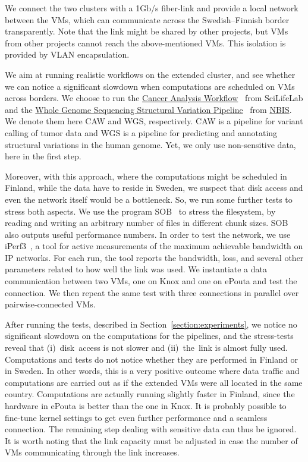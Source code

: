 We connect the two clusters with a 1Gb/s fiber-link and provide a
local network between the VMs, which can communicate across the
Swedish--Finnish border transparently.
%
Note that the link might be shared by other projects, but VMs from
other projects cannot reach the above-mentioned VMs.
%
This isolation is provided by VLAN encapsulation.


We aim at running realistic workflows on the extended cluster, and see
whether we can notice a significant slowdown when computations are
scheduled on VMs across borders.
%
We choose to run the \href{https://github.com/SciLifeLab/CAW}{Cancer
  Analysis Workflow}~\cite{caw} from SciLifeLab and the
\href{https://github.com/NBISweden/wgs-structvar}{Whole Genome
  Sequencing Structural Variation Pipeline}~\cite{caw} from
\href{http://www.nbis.se}{NBIS}.
%
We denote them here CAW and WGS, respectively.
%
CAW is a pipeline for variant calling of tumor data and WGS is a
pipeline for predicting and annotating structural variations in the
human genome.
%
Yet, we only use non-sensitive data, here in the first step.

Moreover, with this approach, where the computations might be
scheduled in Finland, while the data have to reside in Sweden, we
suspect that disk access and even the network itself would be a
bottleneck. So, we run some further tests to stress both aspects.
%
We use the program SOB~\cite{sob} to stress the filesystem, by reading
and writing an arbitrary number of files in different chunk sizes.
%
SOB also outputs useful performance numbers.
%
In order to test the network, we use iPerf3~\cite{iperf}, a tool for
active measurements of the maximum achievable bandwidth on IP
networks.
%
For each run, the tool reports the bandwidth, loss, and several other
parameters related to how well the link was used.
%
We instantiate a data communication between two VMs, one on Knox and
one on ePouta and test the connection.
%
We then repeat the same test with three connections in parallel over
pairwise-connected VMs.


After running the tests, described in
Section~\ref{section:experiments}, we notice no significant slowdown
on the computations for the pipelines, and the stress-tests reveal
that (i)~disk~access is not slower and (ii)~the~link is almost fully
used.
%
Computations and tests do not notice whether they are performed in
Finland or in Sweden.
%
In other words, this is a very positive outcome where data traffic and
computations are carried out as if the extended VMs were all located
in the same country.
%
Computations are actually running slightly faster in Finland, since
the hardware in ePouta is better than the one in Knox.
%
It is probably possible to fine-tune kernel settings
to get even further performance and a seamless connection.
%
The remaining step dealing with sensitive data can thus be ignored.
%
It is worth noting that the link capacity must be adjusted in case the
number of VMs communicating through the link increases.

